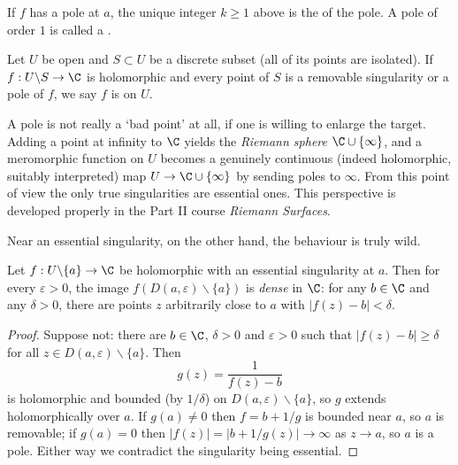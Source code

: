 \begin{definition}
    If $f$ has a pole at $a$, the unique integer $k \geq 1$ above is the  of the pole. A pole of order $1$ is called a .
\end{definition}

\begin{definition}[Meromorphic]
    Let $U$ be open and $S \subset U$ be a discrete subset (all of its points are isolated). If $f: U \backslash S \rightarrow \C$ is holomorphic and every point of $S$ is a removable singularity or a pole of $f$, we say $f$ is  on $U$.
\end{definition}

\begin{remark}
    A pole is not really a `bad point' at all, if one is willing to enlarge the target. Adding a point at infinity to $\C$ yields the \emph{Riemann sphere} $\C \cup \{\infty\}$, and a meromorphic function on $U$ becomes a genuinely continuous (indeed holomorphic, suitably interpreted) map $U \rightarrow \C \cup \{\infty\}$ by sending poles to $\infty$. From this point of view the only true singularities are essential ones. This perspective is developed properly in the Part II course \emph{Riemann Surfaces}.
\end{remark}

Near an essential singularity, on the other hand, the behaviour is truly wild.

\begin{theorem}
    Let $f: U \backslash \{a\} \rightarrow \C$ be holomorphic with an essential singularity at $a$. Then for every $\varepsilon > 0$, the image $f(D(a, \varepsilon) \backslash \{a\})$ is \emph{dense} in $\C$: for any $b \in \C$ and any $\delta > 0$, there are points $z$ arbitrarily close to $a$ with $|f(z) - b| < \delta$.
\end{theorem}
\begin{proof}
    Suppose not: there are $b \in \C$, $\delta > 0$ and $\varepsilon > 0$ such that $|f(z) - b| \geq \delta$ for all $z \in D(a, \varepsilon)\backslash\{a\}$. Then
    $$
    g(z) = \frac{1}{f(z) - b}
    $$
    is holomorphic and bounded (by $1/\delta$) on $D(a, \varepsilon) \backslash \{a\}$, so $g$ extends holomorphically over $a$. If $g(a) \neq 0$ then $f = b + 1/g$ is bounded near $a$, so $a$ is removable; if $g(a) = 0$ then $|f(z)| = |b + 1/g(z)| \rightarrow \infty$ as $z \rightarrow a$, so $a$ is a pole. Either way we contradict the singularity being essential.
\end{proof}

